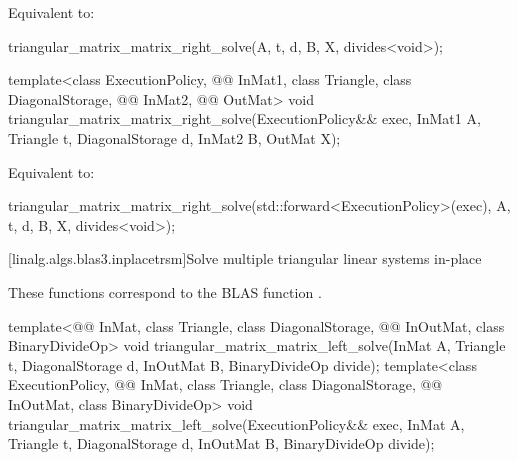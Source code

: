 \begin{itemdescr}
\pnum
\effects
Equivalent to:
\begin{codeblock}
triangular_matrix_matrix_right_solve(A, t, d, B, X, divides<void>{});
\end{codeblock}
\end{itemdescr}

\begin{itemdecl}
template<class ExecutionPolicy, @@ InMat1, class Triangle, class DiagonalStorage,
         @@ InMat2, @@ OutMat>
  void triangular_matrix_matrix_right_solve(ExecutionPolicy&& exec,
                                            InMat1 A, Triangle t, DiagonalStorage d,
                                            InMat2 B, OutMat X);
\end{itemdecl}

\begin{itemdescr}
\pnum
\effects
Equivalent to:
\begin{codeblock}
triangular_matrix_matrix_right_solve(std::forward<ExecutionPolicy>(exec),
                                     A, t, d, B, X, divides<void>{});
\end{codeblock}
\end{itemdescr}

[linalg.algs.blas3.inplacetrsm]{Solve multiple triangular linear systems in-place}

\pnum
\begin{note}
These functions correspond to the BLAS function \supercite{blas3}.
\end{note}

\begin{itemdecl}
template<@@ InMat, class Triangle, class DiagonalStorage,
         @@ InOutMat, class BinaryDivideOp>
  void triangular_matrix_matrix_left_solve(InMat A, Triangle t, DiagonalStorage d,
                                           InOutMat B, BinaryDivideOp divide);
template<class ExecutionPolicy, @@ InMat, class Triangle, class DiagonalStorage,
         @@ InOutMat, class BinaryDivideOp>
  void triangular_matrix_matrix_left_solve(ExecutionPolicy&& exec,
                                           InMat A, Triangle t, DiagonalStorage d,
                                           InOutMat B, BinaryDivideOp divide);
\end{itemdecl}

